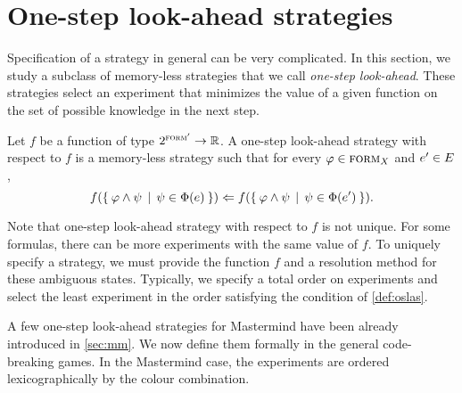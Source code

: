 \section{One-step look-ahead strategies} \label{sec:oslas}

Specification of a strategy in general can be very complicated.
In this section, we study a subclass of memory-less strategies that we call
  \emph{one-step look-ahead}.
These strategies select an experiment that
  minimizes the value of a given function
  on the set of possible knowledge in the next step.

\newcommand{\formset}{\Psi}
\begin{definition}\label{def:oslas}
Let $f$ be a function of type $2^{{\textsc{form}'}} -> \mathbb{R}$.
A one-step look-ahead strategy with respect to $f$ is
  a memory-less strategy such that
  for every $\varphi\in\textsc{form}_X$ and $e'\in E$,
\[
f(\{\:\varphi \wedge \psi \:\:|\:\: \psi\in\Phi(e) \:\}) <=
  f(\{\: \varphi \wedge \psi \:\:|\:\: \psi\in\Phi(e') \:\}).
\]
\end{definition}

Note that one-step look-ahead strategy with respect to $f$ is not unique.
For some formulas, there can be more experiments with the same value of $f$.
To uniquely specify a strategy, we must provide the function $f$ and
  a resolution method for these ambiguous states.
Typically, we specify a total order on experiments and select the least
  experiment in the order satisfying the condition of \autoref{def:oslas}.

A few one-step look-ahead strategies for Mastermind
  have been already introduced in \autoref{sec:mm}.
We now define them formally in the general code-breaking games.
In the Mastermind case,
  the experiments are ordered lexicographically by the colour combination.

